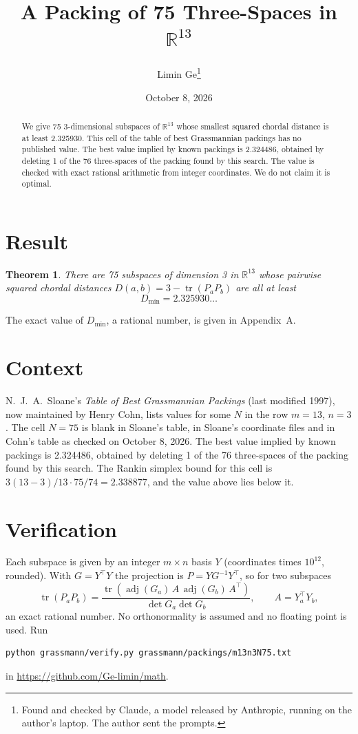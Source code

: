 \documentclass[11pt,a4paper]{article}
\title{A Packing of 75 Three-Spaces in $\mathbb{R}^{13}$}
\author{Limin Ge\thanks{Found and checked by Claude, a model released by Anthropic, running on the author's laptop. The author sent the prompts.}}
\date{October 8, 2026}
\newtheorem*{theorem}{Theorem}
\begin{document}
\maketitle
\begin{abstract}
We give 75 3-dimensional subspaces of $\mathbb{R}^{13}$ whose smallest squared chordal distance is at least 2.325930. This cell of the table of best Grassmannian packings has no published value. The best value implied by known packings is 2.324486, obtained by deleting 1 of the 76 three-spaces of the packing found by this search. The value is checked with exact rational arithmetic from integer coordinates. We do not claim it is optimal.
\end{abstract}

\section{Result}
\begin{theorem}
There are 75 subspaces of dimension 3 in $\mathbb{R}^{13}$ whose pairwise squared chordal distances $D(a,b) = 3 - \operatorname{tr}(P_aP_b)$ are all at least
\[ D_{\min} = 2.325930\ldots \]
\end{theorem}
The exact value of $D_{\min}$, a rational number, is given in Appendix~A.


\section{Context}
N.~J.~A.~Sloane's \emph{Table of Best Grassmannian Packings} (last modified 1997), now maintained by Henry Cohn, lists values for some $N$ in the row $m=13$, $n=3$. The cell $N=75$ is blank in Sloane's table, in Sloane's coordinate files and in Cohn's table as checked on October 8, 2026. The best value implied by known packings is 2.324486, obtained by deleting 1 of the 76 three-spaces of the packing found by this search. The Rankin simplex bound for this cell is $3(13-3)/13\cdot 75/74 = 2.338877$, and the value above lies below it.


\section{Verification}
Each subspace is given by an integer $m\times n$ basis $Y$ (coordinates times $10^{12}$, rounded). With $G=Y^\top Y$ the projection is $P=YG^{-1}Y^\top$, so for two subspaces
\[ \operatorname{tr}(P_aP_b)=\frac{\operatorname{tr}(\operatorname{adj}(G_a)\,A\,\operatorname{adj}(G_b)\,A^\top)}{\det G_a\det G_b},\qquad A=Y_a^\top Y_b, \]
an exact rational number. No orthonormality is assumed and no floating point is used. Run
\begin{verbatim}
python grassmann/verify.py grassmann/packings/m13n3N75.txt
\end{verbatim}
in \url{https://github.com/Ge-limin/math}.
\end{document}
